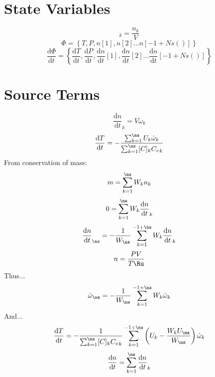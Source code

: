 \documentclass[a4paper,10pt]{article}
\begin{document}
\section{State Variables}
\begin{dmath} [C]_{k} = \frac{n_{k}}{V}\end{dmath} 
\begin{dmath} \Phi = \left\{T,P,n[1],n[2]\ldots n[-1 + Ns()]\right\}\end{dmath} 
\begin{dmath} \frac{\text{d} \Phi }{\text{d} t } = \left\{\frac{\text{d} T }{\text{d} t },\frac{\text{d} P }{\text{d} t },\frac{\text{d} n }{\text{d} t }[1],\frac{\text{d} n }{\text{d} t }[2]\ldots \frac{\text{d} n }{\text{d} t }[-1 + Ns()]\right\}\end{dmath} 
\section{Source Terms}
\begin{dmath} \frac{\text{d} n }{\text{d} t }_{k} = V \dot{\omega}_{k}\end{dmath} 
\begin{dmath} \frac{\text{d} T }{\text{d} t } = - \frac{\sum_{k=1}^{\ns} U_{k} \dot{\omega}_{k}}{\sum_{k=1}^{\ns} [C]_{k} {C_v}_{k}}\end{dmath} 
From conservation of mass:
\begin{dmath} m = \sum_{k=1}^{\ns} W_{k} n_{k}\end{dmath} 
\begin{dmath} 0 = \sum_{k=1}^{\ns} W_{k} \frac{\text{d} n }{\text{d} t }_{k}\end{dmath} 
\begin{dmath} \frac{\text{d} n }{\text{d} t }_{\ns} = - \frac{1}{W_{\ns}} \sum_{k=1}^{-1 + \ns} W_{k} \frac{\text{d} n }{\text{d} t }_{k}\end{dmath} 
\begin{dmath} n = \frac{P V}{T \Ru}\end{dmath} 
Thus...\begin{dmath} \dot{\omega}_{\ns} = - \frac{1}{W_{\ns}} \sum_{k=1}^{-1 + \ns} W_{k} \dot{\omega}_{k}\end{dmath} 
And...\begin{dmath} \frac{\text{d} T }{\text{d} t } = - \frac{1}{\sum_{k=1}^{\ns} [C]_{k} {C_v}_{k}} \sum_{k=1}^{-1 + \ns} \left(U_{k} - \frac{W_{k} U_{\ns}}{W_{\ns}}\right) \dot{\omega}_{k}\end{dmath} 
\begin{dmath} \frac{\text{d} n }{\text{d} t } = \sum_{k=1}^{\ns} \frac{\text{d} n }{\text{d} t }_{k}\end{dmath} 
\end{document}
